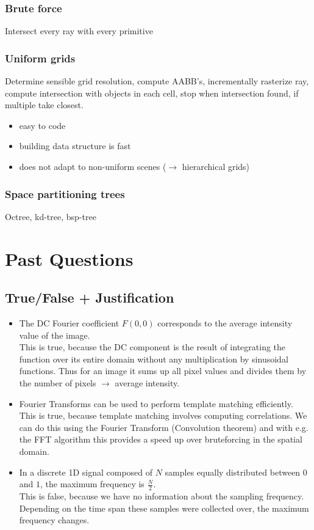 \documentclass[a4paper,10pt]{article}
\newcommand{\cmark}{\text{\ding{51}}}
\newcommand{\xmark}{\text{\ding{55}}}
\newcommand*\good{\item[\textcolor{goodgreen}{\(\bm{+}\)}]}
\newcommand*\bad{\item[\textcolor{badred}{\(\bm{-}\)}]}
\begin{document}
\subsubsection{Brute force} Intersect every ray with every primitive
\subsubsection{Uniform grids} Determine sensible grid resolution, compute AABB's, incrementally rasterize ray, compute intersection with objects in each cell, stop when intersection found, if multiple take closest.
\begin{itemize}
    \good easy to code
    \good building data structure is fast
    \bad does not adapt to non-uniform scenes (\( \to  \) hierarchical grids)
\end{itemize}
\subsubsection{Space partitioning trees} Octree, kd-tree, bsp-tree

\section{Past Questions}
\subsection{True/False + Justification} 
\begin{itemize}
    \item[\cmark] The DC Fourier coefficient \( F(0,0) \) corresponds to the average intensity value of the image.\\
    This is true, because the DC component is the result of integrating the function over its entire domain without any multiplication by sinusoidal functions. Thus for an image it sums up all pixel values and divides them by the number of pixels \( \to  \) average intensity.
    \item[\cmark] Fourier Transforms can be used to perform template matching efficiently.\\
    This is true, because template matching involves computing correlations. We can do this using the Fourier Transform (Convolution theorem) and with e.g. the FFT algorithm this provides a speed up over bruteforcing in the spatial domain.
    \item[\xmark] In a discrete 1D signal composed of \( N \) samples equally distributed between \( 0 \) and \( 1 \), the maximum frequency is \( \frac{N}{2} \).\\
    This is false, because we have no information about the sampling frequency. Depending on the time span these samples were collected over, the maximum frequency changes.
\end{itemize}
\end{document}

